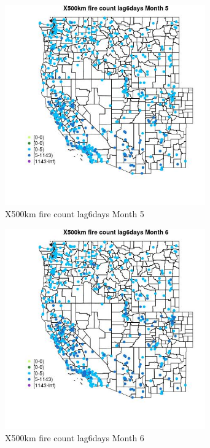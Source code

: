 \begin{figure} 
\centering  
\includegraphics[width=0.77\textwidth]{Code_Outputs/Report_ML_input_PM25_Step4_part_e_de_duplicated_aves_compiled_2019-05-14wNAs_MapObsMo5X500km_fire_count_lag6days.jpg} 
\caption{\label{fig:Report_ML_input_PM25_Step4_part_e_de_duplicated_aves_compiled_2019-05-14wNAsMapObsMo5X500km_fire_count_lag6days}X500km fire count lag6days Month 5} 
\end{figure} 
 

\begin{figure} 
\centering  
\includegraphics[width=0.77\textwidth]{Code_Outputs/Report_ML_input_PM25_Step4_part_e_de_duplicated_aves_compiled_2019-05-14wNAs_MapObsMo6X500km_fire_count_lag6days.jpg} 
\caption{\label{fig:Report_ML_input_PM25_Step4_part_e_de_duplicated_aves_compiled_2019-05-14wNAsMapObsMo6X500km_fire_count_lag6days}X500km fire count lag6days Month 6} 
\end{figure} 
 

